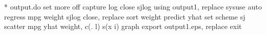 * output.do
set more off
capture log close
{\smallskip}
sjlog using output1, replace
sysuse auto
regress mpg weight
sjlog close, replace
{\smallskip}
sort weight
predict yhat
set scheme sj
scatter mpg yhat weight, c(. l) s(x i)
graph export output1.eps, replace
{\smallskip}
exit
